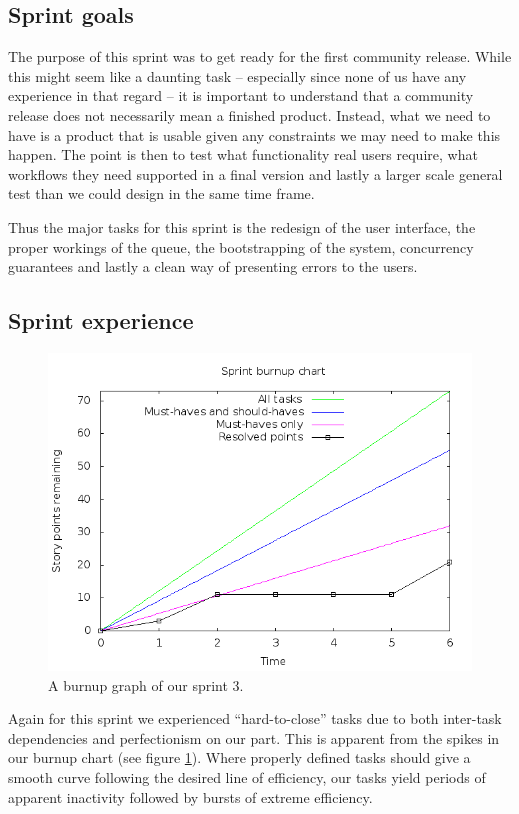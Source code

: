 \documentclass[a4paper]{article}
\begin{document}
\subsection{Sprint goals}
The purpose of this sprint was to get ready for the first community release.
While this might seem like a daunting task -- especially since none of us have
any experience in that regard -- it is important to understand that a community
release does not necessarily mean a finished product. Instead, what we need to
have is a product that is usable given any constraints we may need to make this
happen. The point is then to test what functionality real users require, what
workflows they need supported in a final version and lastly a larger scale general
test than we could design in the same time frame.

Thus the major tasks for this sprint is the redesign of the user interface, the
proper workings of the queue, the bootstrapping of the system, concurrency
guarantees and lastly a clean way of presenting errors to the users.

\subsection{Sprint experience}
\begin{figure}[!ht]
	\centering
	\includegraphics[width=\textwidth/2]{img/burndown.png}
	\caption{A burnup graph of our sprint 3.}
	\label{fig:burnup}
\end{figure}
Again for this sprint we experienced ``hard-to-close'' tasks due to both inter-task
dependencies and perfectionism on our part. This is apparent from the spikes in
our burnup chart (see figure \ref{fig:burnup}). Where properly defined tasks should give a
smooth curve following the desired line of efficiency, our tasks yield periods of
apparent inactivity followed by bursts of extreme efficiency.
\end{document}
